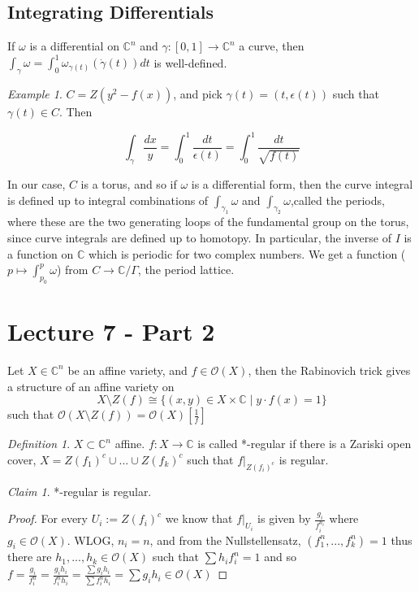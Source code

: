 \documentclass[12pt]{article}
\theoremstyle{remark}
\newtheorem{definition}[theorem]{Definition}
\newtheorem{example}[theorem]{Example}
\newtheorem{claim}[theorem]{Claim}
\newcommand{\C}{\mathbb{C}}
\begin{document}
\subsection{Integrating Differentials}

If $\omega$ is a differential on $\C^n$ and $\gamma: [0,1] \rightarrow\C^n$ a curve, then $\int_\gamma \omega = \int_0^1  \omega_{\gamma(t)}(\dot{\gamma}(t)) dt$ is well-defined.

\begin{example}
$C = Z(y^2-f(x))$, and pick $\gamma(t) = (t, \epsilon(t))$ such that $\gamma(t) \in C$. Then

$$ \int_\gamma \frac{dx}{y} = \int_0^1 \frac{dt}{\epsilon(t)} = \int_0^1 \frac{dt}{\sqrt{f(t)}} $$

In our case, $C$ is a torus, and so if $\omega$ is a differential form, then the curve integral is defined up to integral combinations of $\int_{\gamma_1} \omega$ and $\int_{\gamma_2} \omega$,called the periods, where these are the two generating loops of the fundamental group on the torus, since curve integrals are defined up to homotopy. In particular, the inverse of $I$ is a function on $\C$ which is periodic for two complex numbers. We get a function ($p \mapsto \int_{p_0}^p \omega$) from $C \rightarrow \C / \Gamma$, the period lattice.
\end{example}

\section{Lecture 7 - Part 2}

Let $X \in \C^n$ be an affine variety, and $f \in \mathcal{O}(X)$, then the Rabinovich trick gives a structure of an affine variety on $$X \setminus Z(f) \cong \{ (x,y) \in X \times \C \; | \; y \cdot f(x) =1 \}$$
such that $\mathcal{O}(X \setminus Z(f)) = \mathcal{O}(X)[\frac{1}{f}]$

\begin{definition}
$X \subset \C^n$ affine. $f: X \rightarrow \C$ is called *-regular if there is a Zariski open cover, $X = Z(f_1)^c \cup ... \cup Z(f_k)^c $ such that $f|_{Z(f_i)^c}$ is regular.
\end{definition}

\begin{claim}
*-regular is regular.
\end{claim}

\begin{proof}
For every $U_i := Z(f_i)^c$ we know that $f|_{U_i}$ is given by $\frac{g_i}{f_i^{n_i}}$ where $g_i \in \mathcal{O}(X)$. WLOG, $n_i = n$, and from the Nullstellensatz, $(f_1^n,...,f_k^n)=1$ thus there are $h_1,...,h_k \in \mathcal{O}(X)$ such that $\sum h_i f_i^n = 1$ and so $f = \frac{g_i}{f_i^n} = \frac{g_i h_i}{f_i^n h_i} = \frac{\sum g_i h_i}{ \sum f_i^n h_i} = \sum g_ih_i \in \mathcal{O}(X)$
\end{proof}
\end{document}
